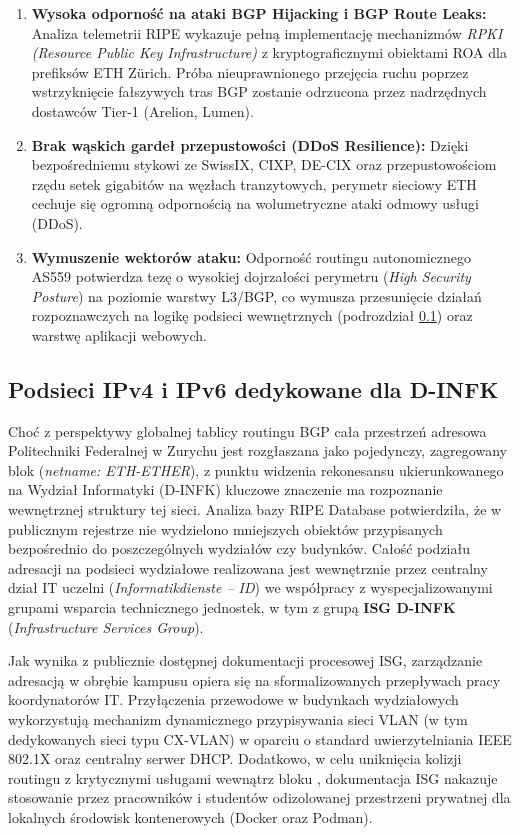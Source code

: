 \begin{enumerate}
    \item \textbf{Wysoka odporność na ataki BGP Hijacking i BGP Route Leaks:} Analiza telemetrii RIPE wykazuje pełną implementację mechanizmów \textit{RPKI (Resource Public Key Infrastructure)} z kryptograficznymi obiektami ROA dla prefiksów ETH Zürich. Próba nieuprawnionego przejęcia ruchu poprzez wstrzyknięcie fałszywych tras BGP zostanie odrzucona przez nadrzędnych dostawców Tier-1 (Arelion, Lumen).
    \item \textbf{Brak wąskich gardeł przepustowości (DDoS Resilience):} Dzięki bezpośredniemu stykowi ze SwissIX, CIXP, DE-CIX oraz przepustowościom rzędu setek gigabitów na węzłach tranzytowych, perymetr sieciowy ETH cechuje się ogromną odpornością na wolumetryczne ataki odmowy usługi (DDoS).
    \item \textbf{Wymuszenie wektorów ataku:} Odporność routingu autonomicznego AS559 potwierdza tezę o wysokiej dojrzałości perymetru (\textit{High Security Posture}) na poziomie warstwy L3/BGP, co wymusza przesunięcie działań rozpoznawczych na logikę podsieci wewnętrznych (podrozdział \ref{subsec:pule-ip}) oraz warstwę aplikacji webowych.
\end{enumerate}

\subsection{Podsieci IPv4 i IPv6 dedykowane dla D-INFK}\label{subsec:pule-ip}

Choć z perspektywy globalnej tablicy routingu BGP cała przestrzeń adresowa Politechniki Federalnej w Zurychu jest rozgłaszana jako pojedynczy, zagregowany blok  (\textit{netname: ETH-ETHER}), z punktu widzenia rekonesansu ukierunkowanego na Wydział Informatyki (D-INFK) kluczowe znaczenie ma rozpoznanie wewnętrznej struktury tej sieci. Analiza bazy RIPE Database potwierdziła, że w publicznym rejestrze nie wydzielono mniejszych obiektów  przypisanych bezpośrednio do poszczególnych wydziałów czy budynków. Całość podziału adresacji na podsieci wydziałowe realizowana jest wewnętrznie przez centralny dział IT uczelni (\textit{Informatikdienste -- ID}) we współpracy z wyspecjalizowanymi grupami wsparcia technicznego jednostek, w tym z grupą \textbf{ISG D-INFK} (\textit{Infrastructure Services Group}).

Jak wynika z publicznie dostępnej dokumentacji procesowej ISG, zarządzanie adresacją w obrębie kampusu opiera się na sformalizowanych przepływach pracy koordynatorów IT. Przyłączenia przewodowe w budynkach wydziałowych wykorzystują mechanizm dynamicznego przypisywania sieci VLAN (w tym dedykowanych sieci typu CX-VLAN) w oparciu o standard uwierzytelniania IEEE 802.1X oraz centralny serwer DHCP. Dodatkowo, w celu uniknięcia kolizji routingu z krytycznymi usługami wewnątrz bloku , dokumentacja ISG nakazuje stosowanie przez pracowników i studentów odizolowanej przestrzeni prywatnej  dla lokalnych środowisk kontenerowych (Docker oraz Podman).

